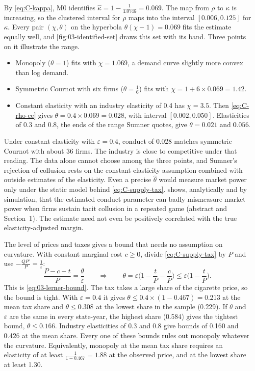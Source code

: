 By \eqref{eq:C-kappa}, M0 identifies $\hat\kappa = 1 - \frac{1}{1.0746} = 0.069$. The map from $\rho$ to $\kappa$ is
increasing, so the clustered interval for $\rho$ maps into the interval $[0.006, 0.125]$ for $\kappa$. Every pair
$(\chi, \theta)$ on the hyperbola $\theta(\chi - 1) = 0.069$ fits the estimate equally well, and
\cref{fig:03-identified-set} draws this set with its band. Three points on it illustrate the range.
\begin{itemize}
\item Monopoly ($\theta = 1$) fits with $\chi = 1.069$, a demand curve slightly more convex than log demand.
\item Symmetric Cournot with six firms ($\theta = \frac{1}{6}$) fits with $\chi = 1 + 6\times0.069 = 1.42$.
\item Constant elasticity with an industry elasticity of 0.4 has $\chi = 3.5$. Then \eqref{eq:C-rho-ce} gives
  $\theta = 0.4\times0.069 = 0.028$, with interval $[0.002, 0.050]$. Elasticities of 0.3 and 0.8, the ends of the
  range Sumner quotes, give $\theta = 0.021$ and $0.056$.
\end{itemize}
Under constant elasticity with $\varepsilon = 0.4$, conduct of 0.028 matches symmetric Cournot with about 36 firms.
The industry is close to competitive under that reading. The data alone cannot choose among the three points, and
Sumner's rejection of collusion rests on the constant-elasticity assumption combined with outside estimates of the
elasticity. Even a precise $\hat\theta$ would measure market power only under the static model behind
\eqref{eq:C-supply-tax}. \citet{Corts1999} shows, analytically and by simulation, that the estimated conduct parameter
can badly mismeasure market power when firms sustain tacit collusion in a repeated game (abstract and Section~1). The
estimate need not even be positively correlated with the true elasticity-adjusted margin.

The level of prices and taxes gives a bound that needs no assumption on curvature. With constant marginal cost
$c \ge 0$, divide \eqref{eq:C-supply-tax} by $P$ and use $-\frac{QP'}{P} = \frac{1}{\varepsilon}$:
\begin{equation*}
\frac{P - c - t}{P} = \frac{\theta}{\varepsilon}
\qquad\Longrightarrow\qquad
\theta = \varepsilon\Big(1 - \frac{t}{P} - \frac{c}{P}\Big) \le \varepsilon\Big(1 - \frac{t}{P}\Big) .
\end{equation*}
This is \eqref{eq:03-lerner-bound}. The tax takes a large share of the cigarette price, so the bound is tight. With
$\varepsilon = 0.4$ it gives $\theta \le 0.4\times(1 - 0.467) = 0.213$ at the mean tax share and $\theta \le 0.308$ at
the lowest share in the sample (0.229). If $\theta$ and $\varepsilon$ are the same in every state-year, the highest
share (0.584) gives the tightest bound, $\theta \le 0.166$. Industry elasticities of 0.3 and 0.8 give bounds of 0.160
and 0.426 at the mean share. Every one of these bounds rules out monopoly whatever the curvature. Equivalently,
monopoly at the mean tax share requires an elasticity of at least $\frac{1}{1 - 0.467} = 1.88$ at the observed price,
and at the lowest share at least 1.30.

